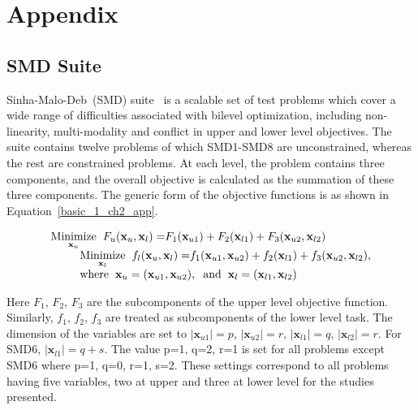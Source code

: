 
\chapter{Appendix}
\label{AppendixA}


\section{SMD Suite}

Sinha-Malo-Deb~(SMD) suite~\cite{sinha2014test} is a scalable set of test problems which cover a wide range of difficulties associated with bilevel optimization, including non-linearity, multi-modality and conflict in upper and lower level objectives. The suite contains twelve problems of which SMD1-SMD8 are unconstrained, whereas the rest are constrained problems. At each level, the problem contains three components, and the overall objective is calculated as the summation of these three components. The generic form of the objective functions is as shown in Equation~\ref{basic_1_ch2_app}.

\begin{equation}
\begin{array}{lr}
 \underset{\mathbf{x}_u}{\text{Minimize}} \hspace{2mm} F_u(\mathbf{x}_u, \mathbf{ x}_l)=$$F_1(\mathbf{x}_{u1})+F_2(\mathbf{x}_{l1}) +F_3(\mathbf{x}_{u2}, \mathbf{x}_{l2})$$\\
\hspace{9mm}\underset{\mathbf{x}_l}{\text{Minimize}}\hspace{2mm} f_l(\mathbf{x}_u, \mathbf{ x}_l)=$$f_1( \mathbf{x}_{u1}, \mathbf{x}_{u2})+f_2(\mathbf{x}_{l1}) +f_3(\mathbf{x}_{u2}, \mathbf{x}_{l2})$$,\\
\hspace{9mm} \text {where}\hspace{2mm}\mathbf{x}_u=( \mathbf{x}_{u1}, \mathbf{x}_{u2}), \hspace{2mm} \text{and} \hspace{2mm} \mathbf{x}_l=( \mathbf{x}_{l1}, \mathbf{x}_{l2})\\
\end{array}
\label{basic_1_ch2_app}
\end{equation}

Here $F_1$, $F_2$, $F_3$ are the subcomponents of the upper level objective function. Similarly, $f_1$, $f_2$, $f_3$ are treated as subcomponents of the lower level task. The dimension of the variables are set to $|\mathbf{x}_{u1}|=p$, $| \mathbf{x}_{u2}|=r$, $|\mathbf{x}_{l1}|=q$, $| \mathbf{x}_{l2}|=r$. For SMD6, $|\mathbf{x}_{l1}|=q+s$. The value p=1, q=2, r=1 is set for all problems except SMD6 where p=1, q=0, r=1, s=2. These settings correspond to all problems having five variables, two at upper and three at lower level for the studies presented.  

